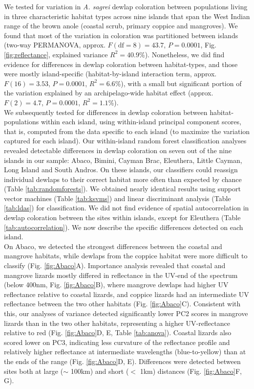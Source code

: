 
We tested for variation in \textit{A. sagrei} dewlap coloration between populations living in three characteristic habitat types across nine islands that span the West Indian range of the brown anole (coastal scrub, primary coppice and mangroves). We found that most of the variation in coloration was partitioned between islands (two-way PERMANOVA, approx. $F(\text{df} = 8) = 43.7$, $P = 0.0001$, Fig. \ref{fig:reflectance}, explained variance $R^2 = 40.9$\%). Nonetheless, we did find evidence for differences in dewlap coloration between habitat-types, and those were mostly island-specific (habitat-by-island interaction term, approx. $F(16) = 3.53$, $P = 0.0001$, $R^2 = 6.6$\%), with a small but significant portion of the variation explained by an archipelago-wide habitat effect (approx. $F(2) = 4.7$, $P = 0.0001$, $R^2 = 1.1$\%).\\

We subsequently tested for differences in dewlap coloration between habitat-populations within each island, using within-island principal component scores, that is, computed from the data specific to each island (to maximize the variation captured for each island). Our within-island random forest classification analyses revealed detectable differences in dewlap coloration on seven out of the nine islands in our sample: Abaco, Bimini, Cayman Brac, Eleuthera, Little Cayman, Long Island and South Andros. On these islands, our classifiers could reassign individual dewlaps to their correct habitat more often than expected by chance (Table \ref{tab:randomforests}). We obtained nearly identical results using support vector machines (Table \ref{tab:ksvms}) and linear discriminant analysis (Table \ref{tab:ldas}) for classification. We did not find evidence of spatial autocorrelation in dewlap coloration between the sites within islands, except for Eleuthera (Table \ref{tab:autocorrelation}). We now describe the specific differences detected on each island.\\

On Abaco, we detected the strongest differences between the coastal and mangrove habitats, while dewlaps from the coppice habitat were more difficult to classify (Fig. \ref{fig:Abaco}A). Importance analysis revealed that coastal and mangrove lizards mostly differed in reflectance in the UV-end of the spectrum (below 400nm, Fig. \ref{fig:Abaco}B), where mangrove dewlaps had higher UV reflectance relative to coastal lizards, and coppice lizards had an intermediate UV reflectance between the two other habitats (Fig. \ref{fig:Abaco}C). Consistent with this, our analyses of variance detected significantly lower PC2 scores in mangrove lizards than in the two other habitats, representing a higher UV-reflectance relative to red (Fig. \ref{fig:Abaco}D, E, Table \ref{tab:anova}). Coastal lizards also scored lower on PC3, indicating less curvature of the reflectance profile and relatively higher reflectance at intermediate wavelengths (blue-to-yellow) than at the ends of the range (Fig. \ref{fig:Abaco}D, E). Differences were detected between sites both at large ($\sim$ 100km) and short ($<$ 1km) distances (Fig. \ref{fig:Abaco}F, G).\\


